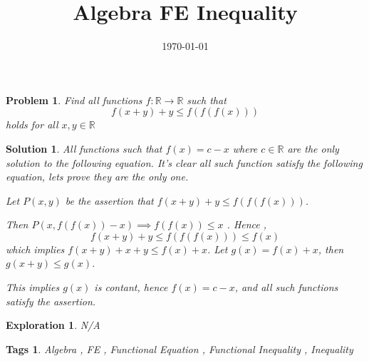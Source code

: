 \documentclass{article}
\title{Algebra FE Inequality}
\date{\today}
\newtheorem*{problem}{Problem}
\newtheorem*{solution}{Solution}
\newtheorem*{exploration}{Exploration}
\newtheorem*{tags}{Tags}
\begin{document}
	
	\maketitle
	
	\begin{problem}
		Find all functions \(f : \mathbb{R} \to \mathbb{R} \) such that
		\[f(x+y)+y \leq f(f(f(x)))\]
		holds for all $x,y \in \mathbb{R}$
	\end{problem}
	
	\begin{solution}
		All functions such that $f(x)=c-x$ where $c \in \mathbb{R} $ are the only solution to the following equation. It's clear all such function satisfy the following equation, lets prove they are the only one.
		
		Let $P(x,y) $ be the assertion that $f(x+y)+y \leq f(f(f(x)))$.
		
		Then $P(x,f(f(x))-x) \implies f(f(x)) \leq  x$ . Hence , 
		\[f(x+y)+y \leq f(f(f(x))) \leq f(x) \] which implies
		$f(x+y)+x+y \leq f(x) + x $. Let $g(x)=f(x)+x$, then $g(x+y) \leq g(x)$. 
		
		This implies $g(x) $ is contant, hence $f(x)=c-x$, and all such functions satisfy the assertion.
	\end{solution}
	
	\begin{exploration}
		N/A
	\end{exploration}
	
	\begin{tags}
		Algebra , FE , Functional Equation , Functional Inequality , Inequality 
	\end{tags}
	
\end{document}
